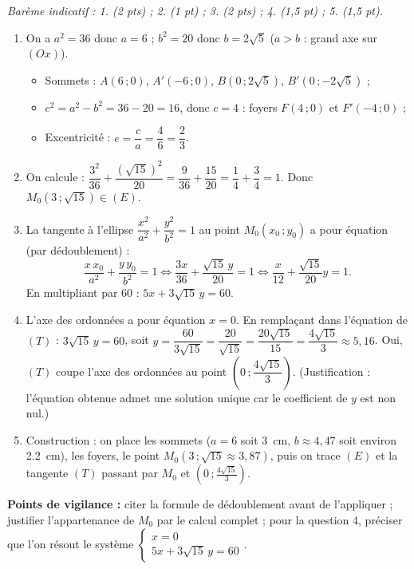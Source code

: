 \documentclass[11pt]{article}
\begin{document}
\begin{corrige}
\emph{Barème indicatif : 1. (2 pts) ; 2. (1 pt) ; 3. (2 pts) ; 4. (1,5 pt) ; 5. (1,5 pt).}
\begin{enumerate}
\item On a $a^{2}=36$ donc $a=6$ ; $b^{2}=20$ donc $b=2\sqrt{5}$ ($a>b$ : grand axe sur $(Ox)$).
\begin{itemize}
\item Sommets : $A(6\,;0)$, $A'(-6\,;0)$, $B(0\,;2\sqrt{5})$, $B'(0\,;-2\sqrt{5})$ ;
\item $c^{2}=a^{2}-b^{2}=36-20=16$, donc $c=4$ : foyers $F(4\,;0)$ et $F'(-4\,;0)$ ;
\item Excentricité : $e=\dfrac{c}{a}=\dfrac{4}{6}=\dfrac{2}{3}$.
\end{itemize}
\item On calcule : $\dfrac{3^{2}}{36}+\dfrac{(\sqrt{15})^{2}}{20}=\dfrac{9}{36}+\dfrac{15}{20}=\dfrac{1}{4}+\dfrac{3}{4}=1$. Donc $M_{0}(3\,;\sqrt{15})\in(E)$.
\item La tangente à l'ellipse $\dfrac{x^{2}}{a^{2}}+\dfrac{y^{2}}{b^{2}}=1$ au point $M_{0}(x_{0}\,;y_{0})$ a pour équation (par dédoublement) :
\[ \dfrac{x\,x_{0}}{a^{2}}+\dfrac{y\,y_{0}}{b^{2}}=1 \iff \dfrac{3x}{36}+\dfrac{\sqrt{15}\,y}{20}=1 \iff \dfrac{x}{12}+\dfrac{\sqrt{15}}{20}y=1. \]
En multipliant par $60$ : $5x+3\sqrt{15}\,y=60$.
\item L'axe des ordonnées a pour équation $x=0$. En remplaçant dans l'équation de $(T)$ : $3\sqrt{15}\,y=60$, soit $y=\dfrac{60}{3\sqrt{15}}=\dfrac{20}{\sqrt{15}}=\dfrac{20\sqrt{15}}{15}=\dfrac{4\sqrt{15}}{3}\approx 5,16$. Oui, $(T)$ coupe l'axe des ordonnées au point $\left(0\,;\dfrac{4\sqrt{15}}{3}\right)$. (Justification : l'équation obtenue admet une solution unique car le coefficient de $y$ est non nul.)
\item Construction : on place les sommets ($a=6$ soit \SI{3}{cm}, $b\approx 4,47$ soit environ \SI{2,2}{cm}), les foyers, le point $M_{0}(3\,;\sqrt{15}\approx 3,87)$, puis on trace $(E)$ et la tangente $(T)$ passant par $M_{0}$ et $\left(0\,;\tfrac{4\sqrt{15}}{3}\right)$.
\end{enumerate}
\textbf{Points de vigilance :} citer la formule de dédoublement avant de l'appliquer ; justifier l'appartenance de $M_{0}$ par le calcul complet ; pour la question 4, préciser que l'on résout le système $\begin{cases} x=0 \\ 5x+3\sqrt{15}\,y=60 \end{cases}$.
\end{corrige}
\end{document}
